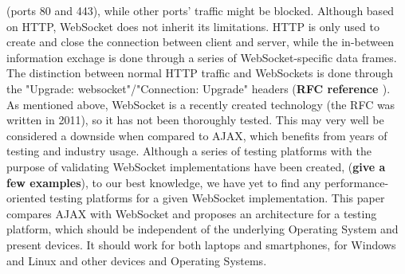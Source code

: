 \documentclass[conference]{IEEEtran}
\begin{document}
(ports 80 and 443), while other ports' traffic might be blocked. Although based
on HTTP, WebSocket does not inherit its limitations. HTTP is only used to create and
close the connection between client and server, while the in-between information
exchage is done through a series of WebSocket-specific data frames.
The distinction between normal HTTP traffic and WebSockets is done through the
"Upgrade: websocket"/"Connection: Upgrade" headers (\textbf{RFC reference \cite{2}}).
\\
\indent
As mentioned above, WebSocket is a recently created technology 
(the RFC was written in 2011), so it has not been thoroughly tested. This may
very well be considered a downside when compared to AJAX, which benefits from
years of testing and industry usage. Although a series of testing platforms
with the purpose of validating WebSocket implementations have been created,
(\textbf{give a few examples}), to our best knowledge, we have yet to find any
performance-oriented testing platforms for a given WebSocket implementation.
This paper compares AJAX with WebSocket and proposes an architecture for
a testing platform, which should be independent of the underlying Operating
System and present devices. It should work for both laptops and smartphones,
for Windows and Linux and other devices and Operating Systems.
\end{document}
